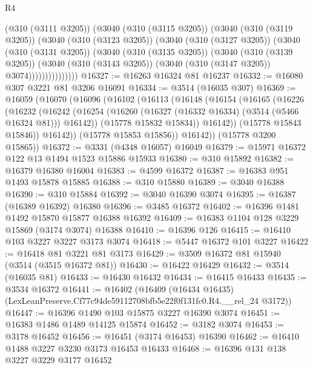 \begin{lexlean}{R4}
\begin{coremodule}
                (@310 (@3111 @3205))
                (@3040
                  (@310 (@3115 @3205))
                  (@3040
                    (@310 (@3119 @3205))
                    (@3040
                      (@310 (@3123 @3205))
                      (@3040
                        (@310 (@3127 @3205))
                        (@3040
                          (@310 (@3131 @3205))
                          (@3040
                            (@310 (@3135 @3205))
                            (@3040
                              (@310 (@3139 @3205))
                              (@3040
                                (@310 (@3143 @3205))
                                (@3040 (@310 (@3147 @3205)) @3074)))))))))))))))
@16327 := @16263 @16324 @81 @16237
@16332 := @16080 @307 @3221 @81 @3206 @16091
@16334 := @3514 (@16035 @307)
@16369 := @16059
    (@16070
      (@16096
        (@16102
          (@16113
            (@16148
              (@16154
                (@16165
                  (@16226
                    (@16232
                      (@16242
                        (@16254 (@16260 (@16327 (@16332 @16334) (@3514 (@5466 @16324 @81))) @16142))
                        (@15778 @15832 @15834))
                      @16142))
                  (@15778 @15843 @15846))
                @16142))
            (@15778 @15853 @15856))
          @16142))
      (@15778 @3200 @15865))
@16372 := @3331 (@4348 @16057) @16049
@16379 := @15971 @16372 @122 @13 @1494 @1523 @15886 @15933
@16380 := @310 @15892
@16382 := @16379 @16380 @16004
@16383 := @4599 @16372
@16387 := @16383 @951 @1493 @15878 @15885
@16388 := @310 @15880
@16389 := @3040 @16388
@16390 := @310 @15884
@16392 := @3040 @16390 @3074
@16395 := @16387 (@16389 @16392) @16380
@16396 := @3485 @16372
@16402 := @16396 @1481 @1492 @15870 @15877 @16388 @16392
@16409 := @16383 @1104 @128 @3229 @15869 (@3174 @3074) @16388
@16410 := @16396 @126
@16415 := @16410 @103 @3227 @3227 @3173 @3074
@16418 := @5447 @16372 @101 @3227
@16422 := @16418 @81 @3221 @81 @3173
@16429 := @3509 @16372 @81 @15940 (@3514 (@3515 @16372 @81))
@16430 := @16422 @16429
@16432 := @3514 (@16035 @81)
@16433 := @16430 @16432
@16434 := @16415 @16433
@16435 := @3534 @16372
@16441 := @16402
    (@16409 (@16434 @16435) (LexLeanPreserve.Cf77c94de59112708bfb5e22f0f131fc0.R4.__rel_24 @3172))
@16447 := @16396 @1490 @103 @15875 @3227 @16390 @3074
@16451 := @16383 @1486 @1489 @14125 @15874
@16452 := @3182 @3074
@16453 := @3178 @16452
@16456 := @16451 (@3174 @16453) @16390
@16462 := @16410 @1488 @3227 @3230 @3173 @16453 @16433
@16468 := @16396 @131 @138 @3227 @3229 @3177 @16452

\end{coremodule}
\end{lexlean}

